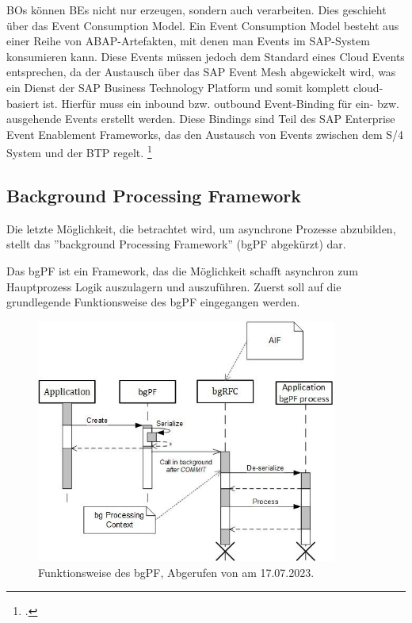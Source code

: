 BOs können BEs nicht nur erzeugen, sondern auch verarbeiten. Dies geschieht über das Event Consumption Model. Ein Event Consumption Model besteht aus einer Reihe von ABAP-Artefakten, mit denen man Events im SAP-System konsumieren kann. Diese Events müssen jedoch dem Standard eines Cloud Events entsprechen, da der Austausch über das SAP Event Mesh abgewickelt wird, was ein Dienst der SAP Business Technology Platform und somit komplett cloud-basiert ist. Hierfür muss ein inbound bzw. outbound Event-Binding für ein- bzw. ausgehende Events erstellt werden. Diese Bindings sind Teil des SAP Enterprise Event Enablement Frameworks, das den Austausch von Events zwischen dem S/4 System und der BTP regelt. \footcite[Vgl.][]{sap_creating_2022}

\subsection{Background Processing Framework}

Die letzte Möglichkeit, die betrachtet wird, um asynchrone Prozesse abzubilden, stellt das ''background Processing Framework'' (bgPF abgekürzt) dar.

Das bgPF ist ein Framework, das die Möglichkeit schafft asynchron zum Hauptprozess Logik auszulagern und auszuführen. Zuerst soll auf die grundlegende Funktionsweise des bgPF eingegangen werden.

\begin{figure}[H]
    \centering
    \includegraphics[height=8cm]{Bilder/bgPF_Schema.png}
    \caption[Funktionsweise des bgPF]{Funktionsweise des bgPF, Abgerufen von \cite{sap_bgpf_2023} am 17.07.2023.}
    \label{fig:iso_norm}
\end{figure}

